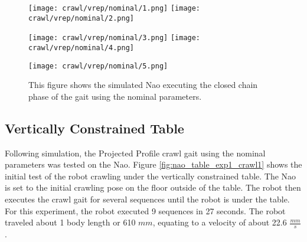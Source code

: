 \begin{figure}
  \centerline{
    \texttt{[image: crawl/vrep/nominal/1.png]}
    \texttt{[image: crawl/vrep/nominal/2.png]}
  }
  \centerline{
    \texttt{[image: crawl/vrep/nominal/3.png]}
    \texttt{[image: crawl/vrep/nominal/4.png]}
  }
  \centerline{
    \texttt{[image: crawl/vrep/nominal/5.png]}
  }
  \caption{This figure shows the simulated Nao executing the closed chain phase
           of the gait using the nominal parameters.}
  \label{fig:vrep_nao_nom_gait1}
\end{figure}

\subsection{Vertically Constrained Table}


Following simulation, the Projected Profile crawl gait using the nominal parameters
was tested on the Nao. Figure \ref{fig:nao_table_exp1_crawl1} shows the initial test of the
robot crawling under the vertically constrained table. The Nao is set to the initial
crawling pose on the floor outside of the table. The robot then executes the crawl
gait for several sequences until the robot is under the table.
For this experiment, the robot executed 9 sequences in 27 seconds. The robot traveled
about 1 body length or 610 $mm$, equating to a velocity of about 22.6 $\frac{mm}{s}$.


